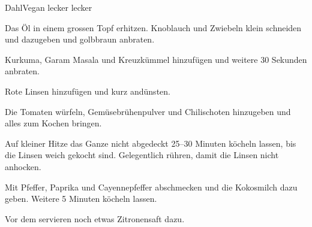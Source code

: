 
\begin{recipe}[]{Dahl}{Vegan lecker lecker}{}



\step%
Das \"Ol in einem grossen Topf erhitzen. Knoblauch und Zwiebeln klein schneiden
und dazugeben und golbbraun anbraten.

\step%
Kurkuma, Garam Masala und Kreuzk\"ummel hinzuf\"ugen und weitere 30 Sekunden
anbraten.

\step%
Rote Linsen hinzuf\"ugen und kurz and\"unsten.

\step%
Die Tomaten w\"urfeln, Gem\"usebr\"uhenpulver und Chilischoten hinzugeben und
alles zum Kochen bringen.


\step%
Auf kleiner Hitze das Ganze nicht abgedeckt 25--30 Minuten k\"ocheln lassen,
bis die Linsen weich gekocht sind.
Gelegentlich r\"uhren, damit die Linsen nicht anhocken.

\step%
Mit Pfeffer, Paprika und Cayennepfeffer abschmecken und die Kokosmilch dazu
geben. Weitere 5 Minuten k\"ocheln lassen.

\step%
Vor dem servieren noch etwas Zitronensaft dazu.


\end{recipe}
